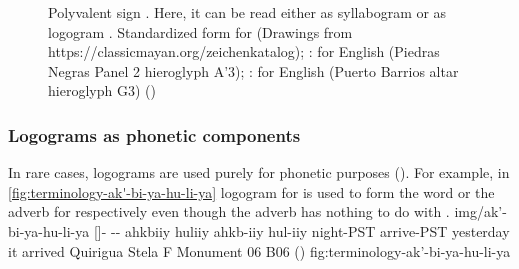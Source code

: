 \documentclass[../main.tex]{subfiles}
\begin{document}
\begin{figure}[ht]
{    }
    \caption[Polyvalent sign ]{Polyvalent sign .
            Here, it can be read either as syllabogram  or 
            as logogram .
            Standardized form for 
            (Drawings from https://classicmayan.org/zeichenkatalog);
            :
             for English 
            (Piedras Negras Panel 2 hieroglyph A'3);
            :
             for 
            English  
            (Puerto Barrios altar hieroglyph G3) (\authordrawings)}
\end{figure}

\subsubsection{Logograms as phonetic components}
In rare cases, logograms are used purely for phonetic purposes (\cite{stuart2020}).
For example, in \cref{fig:terminology-ak'-bi-ya-hu-li-ya}
logogram  for  is used to form the 
word  or the adverb  for 
 respectively even though the adverb  
has nothing to do with .
\glyphanalysis
    {img/ak'-bi-ya-hu-li-ya}
    {[]- 
    --}
    {ahk\glottalstop{}biiy huliiy}
    {ahk\glottalstop{}b-iiy hul-iiy}
    {night-PST arrive-PST}
    {yesterday it arrived}
    {Quirigua Stela F Monument 06 B06 (\authordrawings)}
    {fig:terminology-ak'-bi-ya-hu-li-ya}
\end{document}
